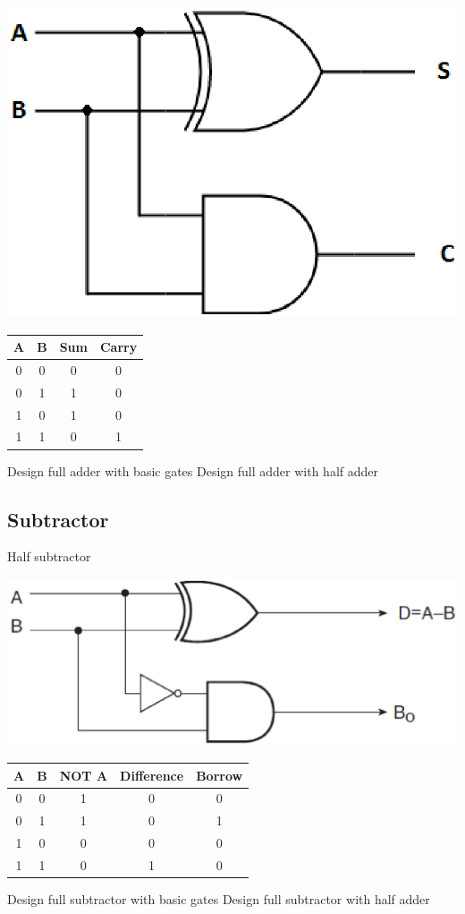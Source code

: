 \documentclass[journal,12pt,twocolumn]{IEEEtran}
\begin{document}
\vspace{0.5cm}
\includegraphics[scale=0.32]{img/Half_Adder}
\begin{table}[h!]
\centering
\begin{tabular}{|cc|c|c|}
\hline
A	&	B	&	   		Sum		&	Carry	\\ \hline
0	&	0	&		    0    	&	0 \\ \hline
0	&	1	&			1		&	0 \\\hline
1	&	0	&			1		&	0 \\\hline
1	&	1	&			0		&	1 \\\hline	

\end{tabular}
\end{table}

\problem Design full adder with basic gates
\problem Design full adder with half adder
\subsection{Subtractor}
\problem Half subtractor

\vspace{0.5cm}
\includegraphics[scale=0.35]{img/half_sub}
\begin{table}[h!]
\centering
\begin{tabular}{|cc|c|c|c|}
\hline
A	&	B	&	NOT A	&	Difference 	&	Borrow	\\ \hline
0	&	0	&	1		&	0	&	0 \\ \hline
0	&	1	&	1		&	0	&	1 \\\hline
1	&	0	&	0		&	0	&	0 \\\hline
1	&	1	&	0		&	1	&	0 \\\hline	

\end{tabular}
\end{table}

\problem Design full subtractor with basic gates
\problem Design full subtractor with half adder
\end{document}

